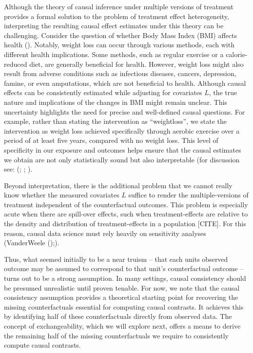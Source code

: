 \documentclass[
  singlecolumn,
  9pt]{article}
\begin{document}
Although the theory of causal inference under multiple versions of
treatment provides a formal solution to the problem of treatment effect
heterogeneity, interpreting the resulting causal effect estimates under
this theory can be challenging. Consider the question of whether Body
Mass Index (BMI) affects health (). Notably, weight loss can occur through various methods,
each with different health implications. Some methods, such as regular
exercise or a calorie-reduced diet, are generally beneficial for health.
However, weight loss might also result from adverse conditions such as
infectious diseases, cancers, depression, famine, or even amputations,
which are not beneficial to health. Although causal effects can be
consistently estimated while adjusting for covariates \(L\), the true
nature and implications of the changes in BMI might remain unclear. This
uncertainty highlights the need for precise and well-defined causal
questions. For example, rather than stating the intervention as
``weightloss'', we state the intervention as weight loss achieved
specifically through aerobic exercise over a period of at least five
years, compared with no weight loss. This level of specificity in our
exposure and outcomes helps ensure that the causal estimates we obtain
are not only statistically sound but also interpretable (for discussion
see: (;
;
).

Beyond interpretation, there is the additional problem that we cannot
really know whether the measured covariates \(L\) suffice to render the
multiple-versions of treatment independent of the counterfactual
outcomes. This problem is especially acute when there are spill-over
effects, such when treatment-effects are relative to the density and
distribution of treatment-effects in a population {[}CITE{]}. For this
reason, causal data science must rely heavily on sensitivity analyses
(VanderWeele ();).

Thus, what seemed initially to be a near truism -- that each units
observed outcome may be assumed to correspond to that unit's
counterfactual outcome -- turns out to be a strong assumption. In many
settings, causal consistency should be presumed unrealistic until proven
tenable. For now, we note that the causal consistency assumption
provides a theoretical starting point for recovering the missing
counterfactuals essential for computing causal contrasts. It achieves
this by identifying half of these counterfactuals directly from observed
data. The concept of exchangeability, which we will explore next, offers
a means to derive the remaining half of the missing counterfactuals we
require to consistently compute causal contrasts.
\end{document}
